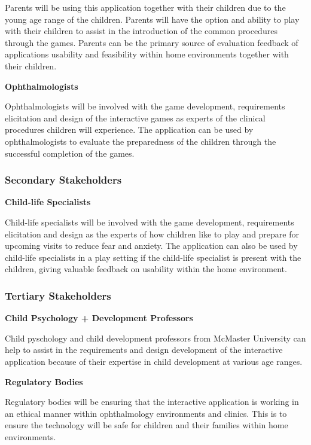 \documentclass{article}
\begin{document}
        Parents will be using this application together with their children due to the 
        young age range of the children. Parents will have the option and ability to 
        play with their children to assist in the introduction of the common 
        procedures through the games. Parents can be the primary source of evaluation 
        feedback of applications usability and feasibility within home environments 
        together with their children.

        \textbf{Ophthalmologists}

        Ophthalmologists will be involved with the game development, requirements 
        elicitation and design of the interactive games as experts of the clinical 
        procedures children will experience. The application can be used by 
        ophthalmologists to evaluate the preparedness of the children through the 
        successful completion of the games. 

    \subsubsection{Secondary Stakeholders}
        
        \textbf{Child-life Specialists}

        Child-life specialists will be involved with the game development, 
        requirements elicitation and design as the experts of how children like to 
        play and prepare for upcoming visits to reduce fear and anxiety. The 
        application can also be used by child-life specialists in a play setting 
        if the child-life specialist is present with the children, giving valuable 
        feedback on usability within the home environment.

    \subsubsection{Tertiary Stakeholders}

        \textbf{Child Psychology + Development Professors}

        Child pyschology and child development professors from McMaster University 
        can help to assist in the requirements and design development of the interactive 
        application because of their expertise in child development at various age ranges.

        \textbf{Regulatory Bodies}
        
        Regulatory bodies will be ensuring that the interactive application is working in 
        an ethical manner within ophthalmology environments and clinics. This is to ensure 
        the technology will be safe for children and their families within home environments.
\end{document}
